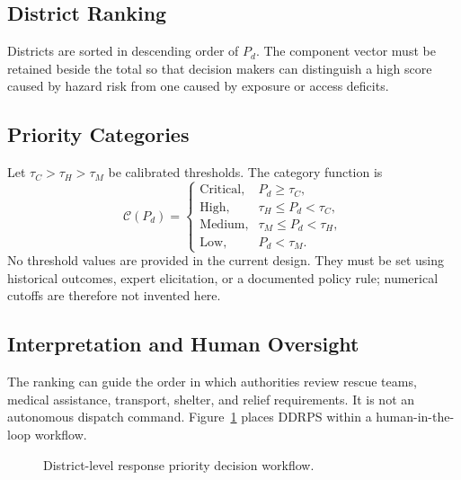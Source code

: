 \documentclass[conference]{IEEEtran}
\begin{document}
\subsection{District Ranking}
Districts are sorted in descending order of $P_d$. The component vector must be
retained beside the total so that decision makers can distinguish a high score
caused by hazard risk from one caused by exposure or access deficits.

\subsection{Priority Categories}
Let $\tau_C>\tau_H>\tau_M$ be calibrated thresholds. The category function is
\begin{equation}
\mathcal{C}(P_d)=
\begin{cases}
\text{Critical},&P_d\geq\tau_C,\\
\text{High},&\tau_H\leq P_d<\tau_C,\\
\text{Medium},&\tau_M\leq P_d<\tau_H,\\
\text{Low},&P_d<\tau_M.
\end{cases}
\end{equation}
No threshold values are provided in the current design. They must be set using
historical outcomes, expert elicitation, or a documented policy rule; numerical
cutoffs are therefore not invented here.

\subsection{Interpretation and Human Oversight}
The ranking can guide the order in which authorities review rescue teams,
medical assistance, transport, shelter, and relief requirements. It is not an
autonomous dispatch command. Figure~\ref{fig:decision} places DDRPS within a
human-in-the-loop workflow.

\begin{figure}[t]
\centering
{}
\caption{District-level response priority decision workflow.}
\label{fig:decision}
\end{figure}
\end{document}
